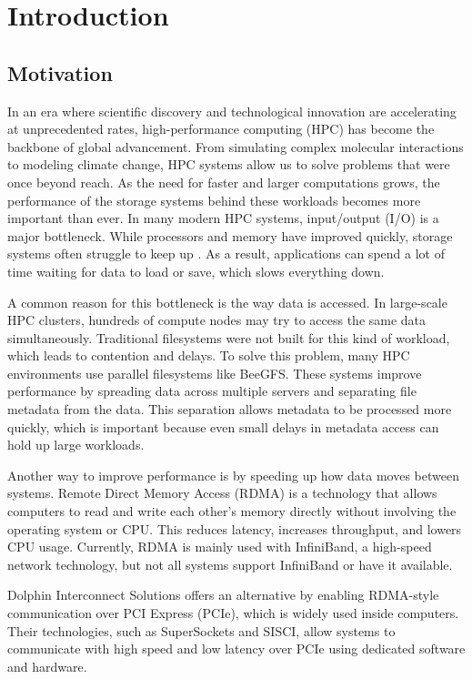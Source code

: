 \chapter{Introduction}

\section{Motivation}
In an era where scientific discovery and technological innovation are accelerating at unprecedented rates, high-performance computing (HPC) has become the backbone of global advancement. From simulating complex molecular interactions to modeling climate change, HPC systems allow us to solve problems that were once beyond reach. As the need for faster and larger computations grows, the performance of the storage systems behind these workloads becomes more important than ever. In many modern HPC systems, input/output (I/O) is a major bottleneck. While processors and memory have improved quickly, storage systems often struggle to keep up \cite{nersc_storage_2020} \cite{9355272}. As a result, applications can spend a lot of time waiting for data to load or save, which slows everything down.

A common reason for this bottleneck is the way data is accessed. In large-scale HPC clusters, hundreds of compute nodes may try to access the same data simultaneously. Traditional filesystems were not built for this kind of workload, which leads to contention and delays. To solve this problem, many HPC environments use parallel filesystems like BeeGFS. These systems improve performance by spreading data across multiple servers and separating file metadata from the data. \cite{6061137} This separation allows metadata to be processed more quickly, which is important because even small delays in metadata access can hold up large workloads.

Another way to improve performance is by speeding up how data moves between systems. Remote Direct Memory Access (RDMA) is a technology that allows computers to read and write each other’s memory directly without involving the operating system or CPU. This reduces latency, increases throughput, and lowers CPU usage. Currently, RDMA is mainly used with InfiniBand, a high-speed network technology, but not all systems support InfiniBand or have it available.

Dolphin Interconnect Solutions offers an alternative by enabling RDMA-style communication over PCI Express (PCIe), which is widely used inside computers. Their technologies, such as SuperSockets and SISCI, allow systems to communicate with high speed and low latency over PCIe using dedicated software and hardware.

